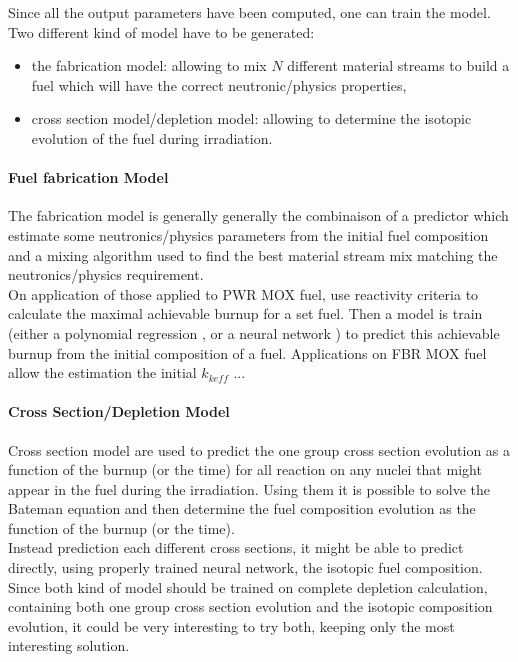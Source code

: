 \documentclass[dvips,12pt]{article}
\begin{document}
Since all the output parameters have been computed, one can train the model. Two different kind of model have to be generated: 
\begin{itemize}
\item the fabrication model: allowing to mix $N$ different material streams to build a fuel which will have the correct neutronic/physics properties,
\item cross section model/depletion model: allowing to determine the isotopic evolution of the fuel during irradiation.
\end{itemize}

\paragraph{Fuel fabrication Model\\}	
The fabrication model is generally generally the combinaison of a predictor which estimate some neutronics/physics parameters from the initial fuel composition and a mixing algorithm used to find the best material stream mix matching the neutronics/physics requirement. \\
On application of those applied to PWR MOX fuel, use reactivity criteria to calculate the maximal achievable burnup for a set fuel.
Then a model is train (either a polynomial regression \cite{Bam_polynomialmodel} , or a neural network \cite{Bal_MLP}) to predict this achievable burnup from the initial composition of a fuel. Applications on FBR MOX fuel allow the estimation the initial $k_{keff}$ \cite{ ?BaL_PHYSOR_2016 ?}...


\paragraph{Cross Section/Depletion Model\\}
Cross section model are used to predict the one group cross section evolution as a function of the burnup (or the time) for all reaction on any nuclei that might appear in the fuel during the irradiation.
Using them it is possible to solve the Bateman equation and then determine the fuel composition evolution as the function of the burnup (or the time).\\
Instead prediction each different cross sections, it might be able to predict directly, using properly trained neural network, the isotopic fuel composition.\\
Since both kind of model should be trained on complete depletion calculation, containing both one group cross section evolution and the isotopic composition evolution, it could be very interesting to try both, keeping only the most interesting solution.
\end{document}
